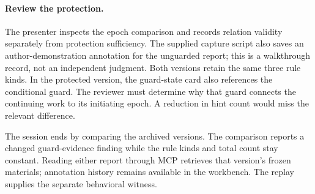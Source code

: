 \paragraph{Review the protection.}
The presenter inspects the epoch comparison and records relation validity separately from protection sufficiency. The supplied capture script also saves an author-demonstration annotation for the unguarded report; this is a walkthrough record, not an independent judgment. Both versions retain the same three rule kinds. In the protected version, the guard-state card also references the conditional guard. The reviewer must determine why that guard connects the continuing work to its initiating epoch. A reduction in hint count would miss the relevant difference.

The session ends by comparing the archived versions. The comparison reports a changed guard-evidence finding while the rule kinds and total count stay constant. Reading either report through MCP retrieves that version's frozen materials; annotation history remains available in the workbench. The replay supplies the separate behavioral witness.
